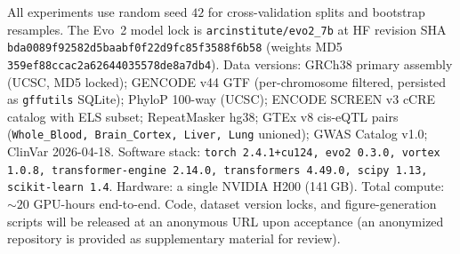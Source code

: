 \documentclass{article}
\theoremstyle{plain}
\theoremstyle{definition}
\theoremstyle{remark}
\begin{document}
All experiments use random seed $42$ for cross-validation splits and
bootstrap resamples. The Evo~2 model lock is
\texttt{arcinstitute/evo2\_7b} at HF revision SHA
\texttt{bda0089f92582d5baabf0f22d9fc85f3588f6b58} (weights MD5
\texttt{359ef88ccac2a62644035578de8a7db4}). Data versions:
GRCh38 primary assembly (UCSC, MD5 locked); GENCODE v44 GTF
(per-chromosome filtered, persisted as \texttt{gffutils} SQLite);
PhyloP 100-way (UCSC); ENCODE SCREEN v3 cCRE catalog with ELS subset;
RepeatMasker hg38; GTEx v8 cis-eQTL pairs (\texttt{Whole\_Blood,
Brain\_Cortex, Liver, Lung} unioned); GWAS Catalog v1.0; ClinVar
2026-04-18. Software stack: \texttt{torch 2.4.1+cu124, evo2 0.3.0,
  vortex 1.0.8, transformer-engine 2.14.0, transformers 4.49.0, scipy
1.13, scikit-learn 1.4}. Hardware: a single NVIDIA H200 (141\,GB).
Total compute: $\sim 20$ GPU-hours end-to-end. Code, dataset version
locks, and figure-generation scripts will be released at an anonymous
URL upon acceptance (an anonymized repository is provided as
supplementary material for review).
\end{document}
